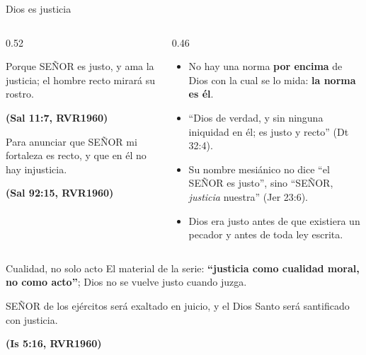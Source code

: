 \documentclass[hyperref={bookmarks=false},aspectratio=169]{beamer}
\newcommand{\SENOR}{S{\fontsize{0.78em}{1em}\selectfont EÑOR}}
\newcommand{\fuente}[1]{\par\hfill{\upshape\bfseries\footnotesize\textcolor{azul}{#1}}}
\newcommand{\destacar}[1]{\textbf{\textcolor{azul}{#1}}}
\begin{document}
\begin{frame}{Dios es justicia}
\begin{columns}[c,onlytextwidth]
\begin{column}{0.52\textwidth}
\begin{cita}Porque \SENOR{} es justo, y ama la justicia; el hombre recto mirará su rostro.\fuente{(Sal 11:7, RVR1960)}\end{cita}
\begin{cita}Para anunciar que \SENOR{} mi fortaleza es recto, y que en él no hay injusticia.\fuente{(Sal 92:15, RVR1960)}\end{cita}
\end{column}
\begin{column}{0.46\textwidth}\small
\begin{itemize}
\item No hay una norma \destacar{por encima} de Dios con la cual se lo mida: \destacar{la norma es él}.
\item ``Dios de verdad, y sin ninguna iniquidad en él; es justo y recto'' (Dt 32:4).
\item Su nombre mesiánico no dice ``el \SENOR{} es justo'', sino ``\SENOR, \emph{justicia} nuestra'' (Jer 23:6).
\item Dios era justo antes de que existiera un pecador y antes de toda ley escrita.
\end{itemize}
\end{column}
\end{columns}
\end{frame}

\begin{frame}{Cualidad, no solo acto}
\small El material de la serie: \destacar{``justicia como cualidad moral, no como acto''}; Dios no se vuelve justo cuando juzga.\par\medskip
\centering
{}\par\medskip
\begin{cita}\SENOR{} de los ejércitos será exaltado en juicio, y el Dios Santo será santificado con justicia.\fuente{(Is 5:16, RVR1960)}\end{cita}
\end{frame}
\end{document}
